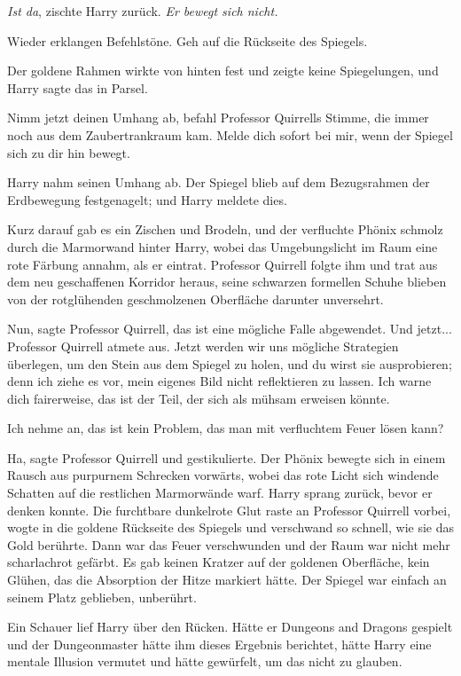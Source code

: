 \glqq{}\emph{Ist da}\grqq{}, zischte Harry zurück. \glqq{}\emph{Er bewegt sich
nicht.}\grqq{}

Wieder erklangen Befehlstöne. \glqq{}Geh auf die Rückseite des Spiegels.\grqq{}

Der goldene Rahmen wirkte von hinten fest und zeigte keine Spiegelungen, und
Harry sagte das in Parsel.

\glqq{}Nimm jetzt deinen Umhang ab\grqq{}, befahl Professor Quirrells Stimme, die
immer noch aus dem Zaubertrankraum kam. \glqq{}Melde dich sofort bei mir, wenn
der Spiegel sich zu dir hin bewegt.\grqq{}

Harry nahm seinen Umhang ab. Der Spiegel blieb auf dem Bezugsrahmen der
Erdbewegung festgenagelt; und Harry meldete dies.

Kurz darauf gab es ein Zischen und Brodeln, und der verfluchte Phönix schmolz
durch die Marmorwand hinter Harry, wobei das Umgebungslicht im Raum eine rote
Färbung annahm, als er eintrat. Professor Quirrell folgte ihm und trat aus dem
neu geschaffenen Korridor heraus, seine schwarzen formellen Schuhe blieben von
der rotglühenden geschmolzenen Oberfläche darunter unversehrt.

\glqq{}Nun\grqq{}, sagte Professor Quirrell, \glqq{}das ist eine mögliche Falle
abgewendet. Und jetzt...\grqq{} Professor Quirrell atmete aus. \glqq{}Jetzt
werden wir uns mögliche Strategien überlegen, um den Stein aus dem Spiegel zu
holen, und du wirst sie ausprobieren; denn ich ziehe es vor, mein eigenes Bild
nicht reflektieren zu lassen. Ich warne dich fairerweise, das ist der Teil, der
sich als mühsam erweisen könnte.\grqq{}

\glqq{}Ich nehme an, das ist kein Problem, das man mit verfluchtem Feuer lösen
kann?\grqq{}

\glqq{}Ha\grqq{}, sagte Professor Quirrell und gestikulierte. Der Phönix bewegte
sich in einem Rausch aus purpurnem Schrecken vorwärts, wobei das rote Licht sich
windende Schatten auf die restlichen Marmorwände warf. Harry sprang zurück,
bevor er denken konnte. Die furchtbare dunkelrote Glut raste an Professor
Quirrell vorbei, wogte in die goldene Rückseite des Spiegels und verschwand so
schnell, wie sie das Gold berührte. Dann war das Feuer verschwunden und der Raum
war nicht mehr scharlachrot gefärbt. Es gab keinen Kratzer auf der goldenen
Oberfläche, kein Glühen, das die Absorption der Hitze markiert hätte. Der
Spiegel war einfach an seinem Platz geblieben, unberührt.

Ein Schauer lief Harry über den Rücken. Hätte er Dungeons and Dragons gespielt
und der Dungeonmaster hätte ihm dieses Ergebnis berichtet, hätte Harry eine
mentale Illusion vermutet und hätte gewürfelt, um das nicht zu glauben.

